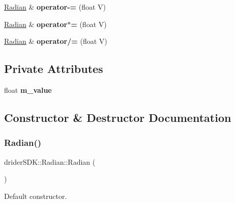 \begin{DoxyCompactItemize}
\mbox{\label{classdrider_s_d_k_1_1_radian_a9746d00ab6b2d02d7ceee3dfe8336226}} 
\hyperlink{classdrider_s_d_k_1_1_radian}{Radian} \& {\bfseries operator-\/=} (float V)
\item 
\mbox{\label{classdrider_s_d_k_1_1_radian_ac2693a74811ab733afdeaa12c492f264}} 
\hyperlink{classdrider_s_d_k_1_1_radian}{Radian} \& {\bfseries operator$\ast$=} (float V)
\item 
\mbox{\label{classdrider_s_d_k_1_1_radian_a61a961f132fb81e6366291e9cd8ed7e1}} 
\hyperlink{classdrider_s_d_k_1_1_radian}{Radian} \& {\bfseries operator/=} (float V)
\end{DoxyCompactItemize}
\subsection*{Private Attributes}
\begin{DoxyCompactItemize}
\item 
\mbox{\label{classdrider_s_d_k_1_1_radian_a3a10447cdeefbfafd08a8e0187f42d91}} 
float {\bfseries m\+\_\+value}
\end{DoxyCompactItemize}


\subsection{Constructor \& Destructor Documentation}
\mbox{\label{classdrider_s_d_k_1_1_radian_a3e670b9e0a28e363b8b20645e2962c66}} 
\subsubsection{\texorpdfstring{Radian()}{Radian()}\hspace{0.1cm}{\footnotesize\ttfamily [1/4]}}
{\footnotesize\ttfamily drider\+S\+D\+K\+::\+Radian\+::\+Radian (\begin{DoxyParamCaption}{ }\end{DoxyParamCaption})}

Default constructor. \mbox{\label{classdrider_s_d_k_1_1_radian_a3f93a33ebb6195d6732bff6262a4c91c}} 
